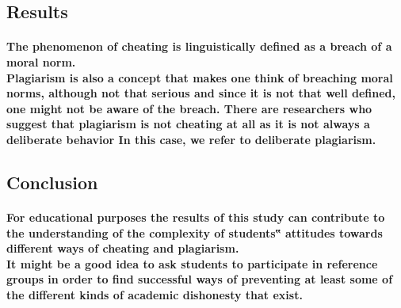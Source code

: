 \documentclass[11pt]{article}
\begin{document}
	   \subsection{\textbf{Results}}
	   \paragraph{\textmd{The phenomenon of cheating is linguistically defined as a breach of a moral norm.\\ Plagiarism is also a concept that makes one think of breaching moral norms, although not that serious and since it is not that well defined, one might not be aware of the breach. There are researchers who suggest that plagiarism is not cheating at all as it is not always a deliberate behavior In this case, we refer to deliberate plagiarism.}}
	   
	   \subsection{ \textbf{Conclusion}}
	   \paragraph{\textmd{For educational purposes the results of this study can contribute to the understanding of the complexity of students‟ attitudes towards different ways of cheating and plagiarism. \\It might be a good idea to ask students to participate in reference groups in order to find successful ways of preventing at least some of the different kinds of academic dishonesty that exist.}}
	   
	
    	
    	
       
\end{document}
